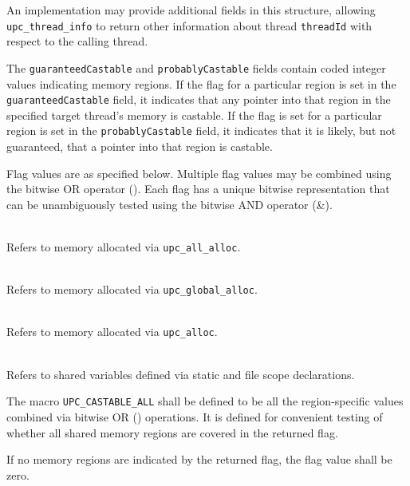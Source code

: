 \np An implementation may provide additional fields in this structure,
allowing {\tt upc\_thread\_info} to return other information about
thread {\tt threadId} with respect to the calling thread.

\np The {\tt guaranteedCastable} and {\tt probablyCastable} fields
contain coded integer values indicating memory regions.  If the flag
for a particular region is set in the {\tt guaranteedCastable} field,
it indicates that
any pointer into that region in the specified target thread's memory is
castable.  If the flag is
set for a particular region is set in the {\tt probablyCastable} field,
it indicates that it is likely, but not guaranteed, that a pointer into
that region is castable.

\np Flag values are as specified below.  Multiple flag values may be
combined using the bitwise OR operator ({\textbar}).  Each flag has a
unique bitwise representation that can be unambiguously tested using the
bitwise AND operator (\&).

\begin{description}
\item[{\tt UPC\_CASTABLE\_ALL\_ALLOC}] \hfill \\
Refers to memory allocated via {\tt upc\_all\_alloc}.
\item[{\tt UPC\_CASTABLE\_GLOBAL\_ALLOC}] \hfill \\
Refers to memory allocated via {\tt upc\_global\_alloc}.
\item[{\tt UPC\_CASTABLE\_ALLOC}] \hfill \\
Refers to memory allocated via {\tt upc\_alloc}.
\item[{\tt UPC\_CASTABLE\_STATIC}] \hfill \\
Refers to shared variables defined via static and file scope declarations.
\end{description}

\np The macro {\tt UPC\_CASTABLE\_ALL} shall
be defined to be all the region-specific values combined via bitwise
OR ({\textbar}) operations.  It is defined for convenient testing of
whether all shared memory regions are covered in the returned flag.

\np If no memory regions are indicated by the returned flag, the flag
value shall be zero.

\pagebreak
\appendix
